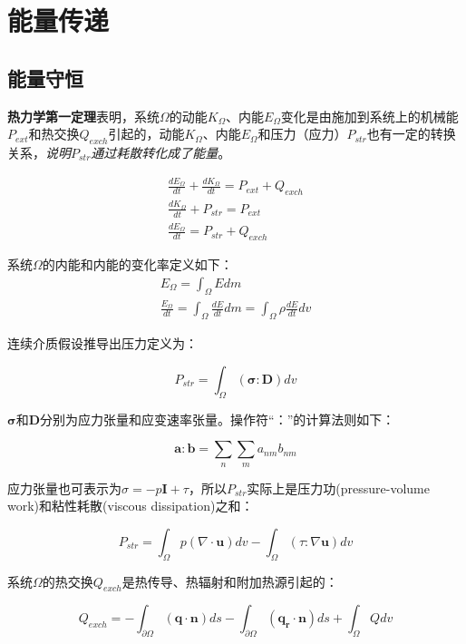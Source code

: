 \section{能量传递}

\subsection{能量守恒}
\textbf{热力学第一定理}表明，系统$\Omega$的动能$K_{\Omega}$、内能$E_{\Omega}$变化是由施加到系统上的机械能$P_{ext}$和热交换$Q_{exch}$引起的，动能$K_{\Omega}$、内能$E_{\Omega}$和压力（应力）$P_{str}$也有一定的转换关系，\textit{说明$P_{str}$通过耗散转化成了能量}。

\begin{gather}
    \frac{dE_{\Omega}}{dt} + \frac{dK_{\Omega}}{dt} = P_{ext} + Q_{exch} \\
    \frac{dK_{\Omega}}{dt} + P_{str} = P_{ext} \\
    \frac{dE_{\Omega}}{dt} = P_{str} + Q_{exch}
\end{gather}

系统$\Omega$的内能和内能的变化率定义如下：
\begin{gather}
    E_{\Omega} = \int_{\Omega} E dm \\
    \frac{E_{\Omega}}{dt} = \int_{\Omega} \frac{dE}{dt} dm = \int_{\Omega} \rho \frac{dE}{dt} dv
\end{gather}

连续介质假设推导出压力定义为：

\begin{equation}
    P_{str} = \int_{\Omega} (\bm{\sigma:D}) dv
\end{equation}

$\bm{\sigma}$和$\bm{D}$分别为应力张量和应变速率张量。操作符“：”的计算法则如下：

\begin{equation}
    \bm{a:b} = \sum_n \sum_m a_{nm}b_{nm}
\end{equation}

应力张量也可表示为$\sigma = -p\bm{I}+\tau$，所以$P_{str}$实际上是压力功(pressure-volume work)和粘性耗散(viscous
dissipation)之和：

\begin{equation}
    P_{str} = \int_{\Omega} p(\nabla\cdot \bm{u}) dv - \int_{\Omega}(\tau:\nabla \bm{u}) dv
\end{equation}

系统$\Omega$的热交换$Q_{exch}$是热传导、热辐射和附加热源引起的：

\begin{equation}
    Q_{exch} = - \int_{\partial\Omega} (\bm{q\cdot n}) ds - \int_{\partial\Omega} (\bm{q_r\cdot n}) ds + \int_{\Omega}Q dv
\end{equation}

